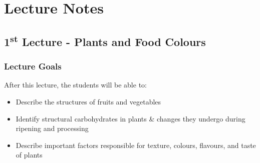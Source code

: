 \chapter{Lecture Notes}
\setlength{\headheight}{12.71342pt}
\addtolength{\topmargin}{-0.71342pt}

\section*{1\texorpdfstring{\textsuperscript{st}}{st} Lecture - Plants and Food Colours}
\subsection*{Lecture Goals}
After this lecture, the students will be able to:
\begin{highlight}
    \begin{itemize}
    \item Describe the structures of fruits and vegetables
    
    \item Identify structural carbohydrates in plants \& changes they undergo during ripening and processing
    
    \item Describe important factors responsible for texture, colours, flavours, and taste of plants
    \end{itemize}
\end{highlight}

